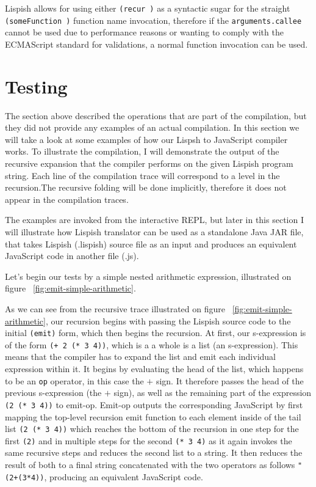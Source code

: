 Lispish allows for using either \texttt{(recur )} as a syntactic sugar for the straight \texttt{(someFunction )} function name invocation, therefore if the \texttt{arguments.callee} cannot be used due to performance reasons or wanting to comply with the ECMAScript standard for validations, a normal function invocation can be used.

\section{Testing}
The section above described the operations that are part of the compilation, but they did not provide any examples of an actual compilation. 
In this section we will take a look at some examples of how our Lispsh to JavaScript compiler works. 
To illustrate the compilation, I will demonstrate the output of the recursive expansion that the compiler performs on the given Lispish program string. 
Each line of the compilation trace will correspond to a level in the recursion.The recursive folding will be done implicitly, therefore it does not appear in the compilation traces. 

The examples are invoked from the interactive REPL, but later in this section I will illustrate how Lispish translator can be used as a standalone Java JAR file, that takes Lispish (.lispish) source file as an input and produces an equivalent JavaScript code in another file (.js).

Let's begin our tests by a simple nested arithmetic expression, illustrated on figure ~\ref{fig:emit-simple-arithmetic}.



As we can see from the recursive trace illustrated on figure ~\ref{fig:emit-simple-arithmetic}, our recursion begins with passing the Lispish source code to the initial \texttt{(emit)} form, which then begins the recursion.
At first, our s-expression is of the form \texttt{(+ 2 (* 3 4))}, which is a a whole is a list (an s-expression). This means that the compiler has to expand the list and emit each individual expression within it. It begins by evaluating the head of the list, which happens to be an \texttt{op} operator, in this case the \texttt{$+$} sign. 
It therefore passes the head of the previous s-expression (the \texttt{$+$} sign), as well as the remaining part of the expression \texttt{(2 (* 3 4))}  to emit-op. 
Emit-op outputs the corresponding JavaScript by first mapping the top-level recursion emit function to each element inside of the tail list \texttt{(2 (* 3 4))} which reaches the bottom of the recursion in one step for the first \texttt{(2)} and in multiple steps for the second \texttt{(* 3 4)} as it again invokes the same recursive steps and reduces the second list to a string. It then reduces the result of both to a final string concatenated with the two operators as follows \texttt{"(2+(3*4))}, producing an equivalent JavaScript code. 

